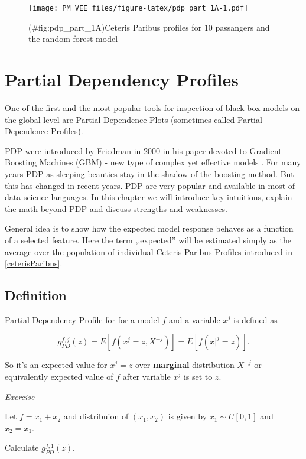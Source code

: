 \documentclass[12pt,]{krantz}
\begin{document}
\begin{figure}
\centering
\texttt{[image: PM\_VEE\_files/figure-latex/pdp\_part\_1A-1.pdf]}
\caption{(\#fig:pdp\_part\_1A)Ceteris Paribus profiles for 10 passangers and the random forest model}
\end{figure}

\hypertarget{partialDependenceProfiles}{%
\section{Partial Dependency Profiles}\label{partialDependenceProfiles}}

One of the first and the most popular tools for inspection of black-box models on the global level are Partial Dependence Plots (sometimes called Partial Dependence Profiles).

PDP were introduced by Friedman in 2000 in his paper devoted to Gradient Boosting Machines (GBM) - new type of complex yet effective models \citep{Friedman00greedyfunction}. For many years PDP as sleeping beauties stay in the shadow of the boosting method. But this has changed in recent years. PDP are very popular and available in most of data science languages. In this chapter we will introduce key intuitions, explain the math beyond PDP and discuss strengths and weaknesses.

General idea is to show how the expected model response behaves as a function of a selected feature. Here the term ,,expected'' will be estimated simply as the average over the population of individual Ceteris Paribus Profiles introduced in \ref{ceterisParibus}.

\hypertarget{definition}{%
\subsection{Definition}\label{definition}}

Partial Dependency Profile for for a model \(f\) and a variable \(x^j\) is defined as

\[
g_{PD}^{f, j}(z) = E[f(x^j=z, X^{-j})] = E[f(x|^j=z)].
\]

So it's an expected value for \(x^j = z\) over \textbf{marginal} distribution \(X^{-j}\) or equivalently expected value of \(f\) after variable \(x^j\) is set to \(z\).

\emph{Exercise}

Let \(f = x_1 + x_2\) and distribuion of \((x_1, x_2)\) is given by \(x_1 \sim U[0,1]\) and \(x_2=x_1\).

Calculate \(g_{PD}^{f, 1}(z)\).
\end{document}
